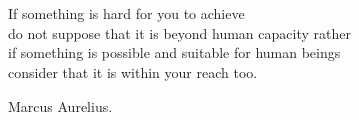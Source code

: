 \cleardoublepage %
\chapter*{}
\setlength{\leftmargin}{0.5\textwidth}
\setlength{\parsep}{0cm}
\addtolength{\topsep}{0.5cm}
\begin{flushright}
	\small\em{
		If something is hard for you to achieve \\
		do not suppose that it is beyond human capacity rather\\ 
		if something is possible and suitable for human beings \\
		consider that it is within your reach too.
		
	}
\end{flushright}
\begin{flushright}
	\small{
		Marcus Aurelius.
	}
\end{flushright}
\cleardoublepage %